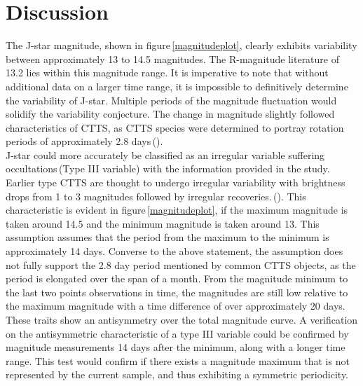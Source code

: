 \documentclass[onecolumn]{aastex6}
\begin{document}
\section{Discussion}
The J-star magnitude, shown in figure\,\ref{magnitudeplot}, clearly exhibits variability between approximately 13 to 14.5 magnitudes. The R-magnitude literature of 13.2 lies within this magnitude range. It is imperative to note that without additional data on a larger time range, it is impossible to definitively determine the variability of J-star. Multiple periods of the magnitude fluctuation would solidify the variability conjecture. The change in magnitude slightly followed characteristics of CTTS, as CTTS species were determined to portray rotation periods of approximately 2.8 days\,(\cite{5}).
\\
\indent J-star could more accurately be classified as an irregular variable suffering occultations\,(Type III variable) with the information provided in the study. Earlier type CTTS are thought to undergo irregular variability with brightness drops from 1 to 3 magnitudes followed by irregular recoveries.\,(\cite{5}). This characteristic is evident in figure\,\ref{magnitudeplot}, if the maximum magnitude is taken around 14.5 and the minimum magnitude is taken around 13. This assumption assumes that the period from the maximum to the minimum is approximately 14 days. Converse to the above statement, the assumption does not fully support the 2.8 day period mentioned by common CTTS objects, as the period is elongated over the span of a month. From the magnitude minimum to the last two points observations in time, the magnitudes are still low relative to the maximum magnitude with a time difference of over approximately 20 days. These traits show an antisymmetry over the total magnitude curve. A verification on the antisymmetric characteristic of a type III variable could be confirmed by magnitude measurements 14 days after the minimum, along with a longer time range. This test would confirm if there exists a magnitude maximum that is not represented by the current sample, and thus exhibiting a symmetric periodicity.




\vspace{5mm}
\end{document}
